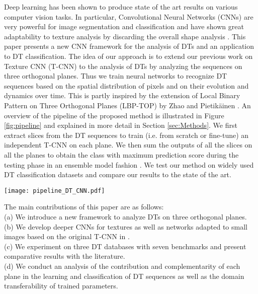 \documentclass[a4paper,11pt]{article}
\begin{document}
Deep learning has been shown to produce state of the art results on various computer vision tasks. In particular, Convolutional Neural Networks (CNNs) are very powerful for image segmentation and classification 
and have shown great adaptability to texture analysis by discarding the overall shape analysis \cite{andrearczyk2016using,cimpoi2014deep,lin2015visualizing}.
This paper presents a new CNN framework for the analysis of DTs and an application to DT classification. 
The idea of our approach is to extend our previous work on Texture CNN (T-CNN) \cite{andrearczyk2016using} to the analysis of DTs by analyzing the sequences on three orthogonal planes. 
Thus we train neural networks to recognize DT sequences based on the spatial distribution of pixels and on their evolution and dynamics over time.
This is partly inspired by the extension of Local Binary Pattern on Three Orthogonal Planes (LBP-TOP) by Zhao and Pietik\"ainen \cite{zhao2007dynamic}.
An overview of the pipeline of the proposed method is illustrated in Figure \ref{fig:pipeline} and explained in more detail in Section \ref{sec:Methods}.
We first extract slices from the DT sequences to train (i.e. from scratch or fine-tune) an independent T-CNN on each plane.
We then sum the outputs of all the slices on all the planes to obtain the class with maximum prediction score during the testing phase in an ensemble model fashion \cite{hansen1990neural}. 
We test our method on widely used DT classification datasets and compare our results to the state of the art.
\begin{figure*}[!t]
\centering
\texttt{[image: pipeline\_DT\_CNN.pdf]}
  \caption{Overview of the proposed method for the classification of a DT sequence based on T-CNNs on three orthogonal planes in an ensemble model approach.
  The CNNs separately classify frames extracted from a input DT sequence on three planes. The outputs of the last fully-connected layers are summed and the highest score gives the collective classification decision.}\label{fig:pipeline}
\end{figure*}

The main contributions of this paper are as follows:
\\(a) We introduce a new framework to analyze DTs on three orthogonal planes.
\\(b) We develop deeper CNNs for textures as well as networks adapted to small images based on the original T-CNN in \cite{andrearczyk2016using}.
\\(c) We experiment on three DT databases with seven benchmarks and present comparative results with the literature.
\\(d) We conduct an analysis of the contribution and complementarity of each plane in the learning and classification of DT sequences as well as the domain transferability of trained parameters.
\end{document}
